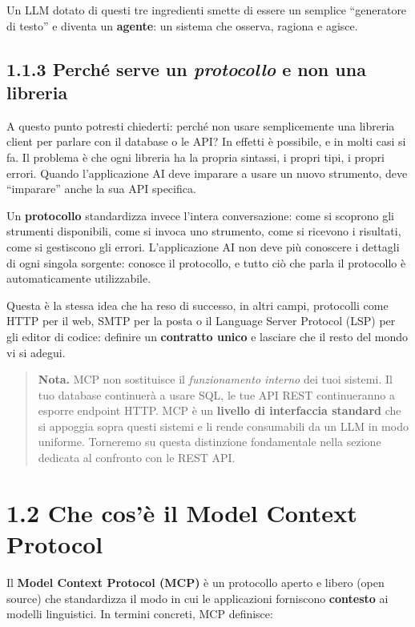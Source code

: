 \documentclass[
  italian,
  10pt,
]{book}
\begin{document}
Un LLM dotato di questi tre ingredienti smette di essere un semplice
``generatore di testo'' e diventa un \textbf{agente}: un sistema che
osserva, ragiona e agisce.

\subsection{\texorpdfstring{1.1.3 Perché serve un \emph{protocollo} e
non una
libreria}{1.1.3 Perché serve un protocollo e non una libreria}}\label{perchuxe9-serve-un-protocollo-e-non-una-libreria}

A questo punto potresti chiederti: perché non usare semplicemente una
libreria client per parlare con il database o le API? In effetti è
possibile, e in molti casi si fa. Il problema è che ogni libreria ha la
propria sintassi, i propri tipi, i propri errori. Quando l'applicazione
AI deve imparare a usare un nuovo strumento, deve ``imparare'' anche la
sua API specifica.

Un \textbf{protocollo} standardizza invece l'intera conversazione: come
si scoprono gli strumenti disponibili, come si invoca uno strumento,
come si ricevono i risultati, come si gestiscono gli errori.
L'applicazione AI non deve più conoscere i dettagli di ogni singola
sorgente: conosce il protocollo, e tutto ciò che parla il protocollo è
automaticamente utilizzabile.

Questa è la stessa idea che ha reso di successo, in altri campi,
protocolli come HTTP per il web, SMTP per la posta o il Language Server
Protocol (LSP) per gli editor di codice: definire un \textbf{contratto
unico} e lasciare che il resto del mondo vi si adegui.

\begin{quote}
\textbf{Nota.} MCP non sostituisce il \emph{funzionamento interno} dei
tuoi sistemi. Il tuo database continuerà a usare SQL, le tue API REST
continueranno a esporre endpoint HTTP. MCP è un \textbf{livello di
interfaccia standard} che si appoggia sopra questi sistemi e li rende
consumabili da un LLM in modo uniforme. Torneremo su questa distinzione
fondamentale nella sezione dedicata al confronto con le REST API.
\end{quote}

\section{1.2 Che cos'è il Model Context
Protocol}\label{che-cosuxe8-il-model-context-protocol}

Il \textbf{Model Context Protocol (MCP)} è un protocollo aperto e libero
(open source) che standardizza il modo in cui le applicazioni forniscono
\textbf{contesto} ai modelli linguistici. In termini concreti, MCP
definisce:
\end{document}
